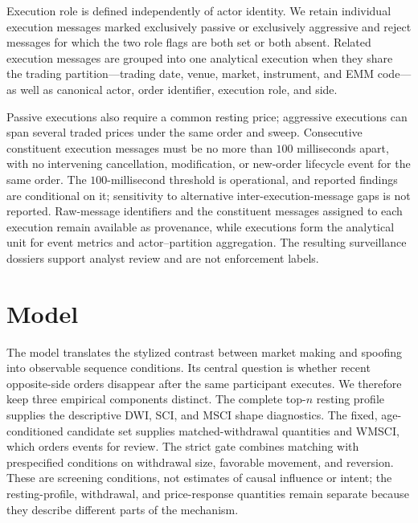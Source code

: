 \documentclass[11pt]{article}
\begin{document}
Execution role is defined independently of actor identity. We retain individual execution messages marked exclusively passive or exclusively
aggressive and reject messages for which the two role flags are both set or both absent. Related execution messages are grouped into
one analytical execution when they share the trading partition---trading date, venue, market, instrument, and EMM code---as
well as canonical actor, order identifier, execution role, and side.

\pagebreak[4]

Passive executions also require a common resting price; aggressive executions can span several traded prices under the same order and sweep. Consecutive constituent execution
messages must be no more than $100$ milliseconds apart, with no intervening cancellation, modification, or new-order
lifecycle event for the same order. The $100$-millisecond threshold is operational, and reported findings are conditional on
it; sensitivity to alternative inter-execution-message gaps is not reported. Raw-message identifiers and the constituent
messages assigned to each execution remain available as provenance, while executions form the analytical unit for event
metrics and actor--partition aggregation. The resulting surveillance dossiers support analyst review and are not enforcement
labels.

\section{Model}
\label{sec:model}
The model translates the stylized contrast between market making and spoofing into observable sequence conditions. Its
central question is whether recent opposite-side orders disappear after the same participant executes. We therefore keep
three empirical components distinct. The complete top-$n$ resting profile supplies the descriptive DWI, SCI, and MSCI shape
diagnostics. The fixed, age-conditioned candidate set supplies matched-withdrawal quantities and WMSCI, which orders events
for review. The strict gate combines matching with prespecified conditions on withdrawal size, favorable movement, and reversion.
These are screening conditions, not estimates of causal influence or intent; the resting-profile, withdrawal, and
price-response quantities remain separate because they describe different parts of the mechanism.
\end{document}
